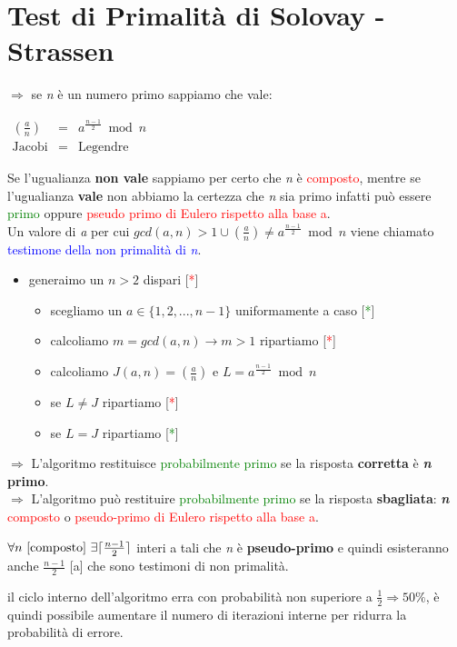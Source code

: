 \section{Test di Primalità di Solovay - Strassen}
$\Rightarrow$ se \textit{n} è un numero primo sappiamo che vale:
\begin{center}
    \begin{math}
        \begin{aligned}
            (\frac{a}{n}) &=& a^{\frac{n - 1}{2}} \bmod n \\
            \text{Jacobi} &=& \text{Legendre}
        \end{aligned}
    \end{math}
\end{center}
Se l'ugualianza \textbf{non vale} sappiamo per certo che \textit{n} è \textcolor{red}{composto}, mentre se l'ugualianza \textbf{vale} non abbiamo la certezza che \textit{n} sia primo infatti può essere \textcolor{green}{primo} oppure \textcolor{red}{pseudo primo di Eulero rispetto alla base a}. \\
Un valore di \textit{a} per cui $gcd(a, n) > 1 \cup (\frac{a}{n}) \ne a^{\frac{n - 1}{2}} \bmod n$ viene chiamato \textcolor{blue}{testimone della non primalità di \textit{n}}.
\begin{itemize}
    \item generaimo un $n > 2$ dispari [\textcolor{red}{*}]
    \begin{itemize}
        \item scegliamo un $a \in \{1, 2, ..., n - 1\}$ uniformamente a caso [\textcolor{green}{*}]
        \item calcoliamo $m = gcd(a, n) \rightarrow m > 1$ ripartiamo [\textcolor{red}{*}]
        \item calcoliamo $J(a, n) = (\frac{a}{n})$ e $L = a^{\frac{n - 1}{2}} \bmod n$
        \item se $L \neq J$ ripartiamo [\textcolor{red}{*}]
        \item se $L = J$ ripartiamo [\textcolor{green}{*}]
    \end{itemize}
\end{itemize}
$\Rightarrow$ L'algoritmo restituisce \textcolor{green}{probabilmente primo} se la risposta \textbf{corretta} è \textbf{\textit{n} primo}. \\
$\Rightarrow$ L'algoritmo può restituire \textcolor{green}{probabilmente primo} se la risposta \textbf{sbagliata}: \textbf{\textit{n}}  \textcolor{red}{composto} o \textcolor{red}{pseudo-primo di Eulero rispetto alla base a}.
\begin{center}
    $\forall n \text{ [composto] } \exists \lceil\frac{n - 1}{2}\rceil$ interi a tali che \textit{n} è \textbf{pseudo-primo} e quindi esisteranno anche $\frac{n - 1}{2}$ [a] che sono testimoni di non primalità.
\end{center}
il ciclo interno dell'algoritmo erra con probabilità non superiore a $\frac{1}{2} \Rightarrow 50\%$, è quindi possibile aumentare il numero di iterazioni interne per ridurra la probabilità di errore.


